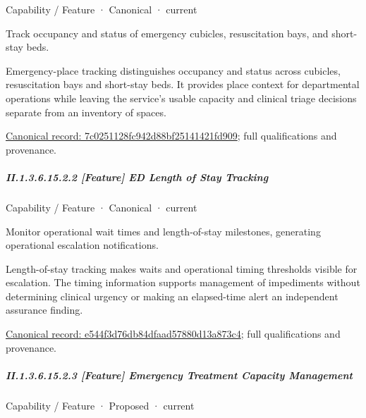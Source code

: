 \label{element:7c0251128fc942d88bf25141421fd909}
{\small Capability / Feature · Canonical · current}\par

Track occupancy and status of emergency cubicles, resuscitation bays, and short-stay beds.



Emergency-place tracking distinguishes occupancy and status across cubicles, resuscitation bays and short-stay beds. It provides place context for departmental operations while leaving the service's usable capacity and clinical triage decisions separate from an inventory of spaces.


{\footnotesize \href{../../../../../../../continuum/strategy/capability/feature/7c0251128fc942d88bf25141421fd909.md}{Canonical record: 7c0251128fc942d88bf25141421fd909}; full qualifications and provenance.}\par
\subparagraph*{II.1.3.6.15.2.2 [Feature] ED Length of Stay Tracking}
\label{navigation:II.1.3.6.15.2.2}

\label{element:e544f3d76db84dfaad57880d13a873c4}
{\small Capability / Feature · Canonical · current}\par

Monitor operational wait times and length-of-stay milestones, generating operational escalation notifications.



Length-of-stay tracking makes waits and operational timing thresholds visible for escalation. The timing information supports management of impediments without determining clinical urgency or making an elapsed-time alert an independent assurance finding.


{\footnotesize \href{../../../../../../../continuum/strategy/capability/feature/e544f3d76db84dfaad57880d13a873c4.md}{Canonical record: e544f3d76db84dfaad57880d13a873c4}; full qualifications and provenance.}\par
\subparagraph*{II.1.3.6.15.2.3 [Feature] Emergency Treatment Capacity Management}
\label{navigation:II.1.3.6.15.2.3}

\label{element:502876430cf747f4b3bb102fb69557a5}
{\small Capability / Feature · Proposed · current}\par

